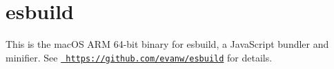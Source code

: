 \chapter{esbuild}
\hypertarget{md__2_users_2hello_2_documents_2_git_hub_2finalproject-engine-drop-table-engines_2_engine_2src_22bd5c529f953ac29087ffc0a42a85da5}{}\label{md__2_users_2hello_2_documents_2_git_hub_2finalproject-engine-drop-table-engines_2_engine_2src_22bd5c529f953ac29087ffc0a42a85da5}
\label{md__2_users_2hello_2_documents_2_git_hub_2finalproject-engine-drop-table-engines_2_engine_2src_22bd5c529f953ac29087ffc0a42a85da5_autotoc_md781}%
%


This is the mac\+OS ARM 64-\/bit binary for esbuild, a Java\+Script bundler and minifier. See \href{https://github.com/evanw/esbuild}{\texttt{ https\+://github.\+com/evanw/esbuild}} for details. 